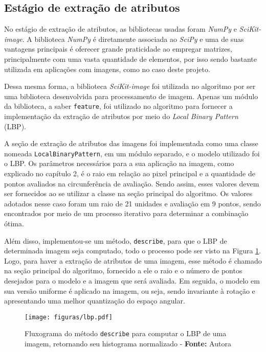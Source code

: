 \subsection{Estágio de extração de atributos}

No estágio de extração de atributos, as bibliotecas usadas foram \textit{NumPy} e \textit{SciKit-image}. A biblioteca \textit{NumPy} é diretamente associada ao \textit{SciPy} e uma de suas vantagens principais é oferecer grande praticidade ao empregar matrizes, principalmente com uma vasta quantidade de elementos, por isso sendo bastante utilizada em aplicações com imagens, como no caso deste projeto.

Dessa mesma forma, a biblioteca \textit{SciKit-image} foi utilizada no algoritmo por ser uma biblioteca desenvolvida para processamento de imagem. Apenas um módulo da biblioteca, a saber \texttt{feature}, foi utilizado no algoritmo para fornecer a implementação da extração de atributos por meio do \textit{Local Binary Pattern} (LBP).

A seção de extração de atributos das imagens foi implementada como uma classe nomeada \texttt{LocalBinaryPattern}, em um módulo separado, e o modelo utilizado foi o LBP. Os parâmetros necessários para a sua aplicação na imagem, como explicado no capítulo 2, é o raio em relação ao pixel principal e a quantidade de pontos avaliados na circunferência de avaliação. Sendo assim, esses valores devem ser fornecidos ao se utilizar a classe na seção principal do algoritmo. Os valores adotados nesse caso foram um raio de 21 unidades e avaliação em 9 pontos, sendo encontrados por meio de um processo iterativo para determinar a combinação ótima.

Além disso, implementou-se um método, \texttt{describe}, para que o LBP de determinada imagem seja computado, todo o processo pode ser visto na Figura \ref{fig:flowLBP}. Logo, para haver a extração de atributos de uma imagem, esse método é chamado na seção principal do algoritmo, fornecido a ele o raio e o número de pontos desejados para o modelo e a imagem que será avaliada. Em seguida, o modelo em sua versão uniforme é aplicado na imagem, ou seja, sendo invariante à rotação e apresentando uma melhor quantização do espaço angular.

\begin{figure}[H]
  \centering
  \texttt{[image: figuras/lbp.pdf]}
  \caption{Fluxograma do método \texttt{describe} para computar o LBP de uma imagem, retornando seu histograma normalizado - \textbf{Fonte:} Autora}
  \label{fig:flowLBP}
\end{figure}

